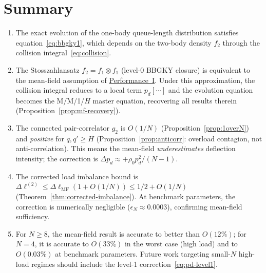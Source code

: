 \documentclass[11pt,a4paper]{article}
\newcommand{\pd}{p_d}
\newcommand{\fone}{f_1}
\newcommand{\ftwo}{f_2}
\newcommand{\gtwo}{g_2}
\begin{document}
\section{Summary}

\begin{enumerate}
  \item The exact evolution of the one-body queue-length distribution
        satisfies equation~\eqref{eq:bbgky1}, which depends on the
        two-body density $\ftwo$ through the collision integral~\eqref{eq:collision}.

  \item The Stosszahlansatz $\ftwo = \fone \otimes \fone$
        (level-0 BBGKY closure) is equivalent to the mean-field
        assumption of \hyperref[chap:load_balance]{Performance~I}.
        Under this approximation, the collision integral reduces to a
        local term $\pd[\cdots]$ and the evolution equation becomes
        the M/M/1/$H$ master equation, recovering all results therein
        (Proposition~\ref{prop:mf-recovery}).

  \item The connected pair-correlator $\gtwo$ is $O(1/N)$
        (Proposition~\ref{prop:1overN}) and \emph{positive} for
        $q, q' \geq H$ (Proposition~\ref{prop:anticorr}: overload
        contagion, not anti-correlation).
        This means the mean-field \emph{underestimates} deflection
        intensity; the correction is $\Delta\pd \approx +\rho_0\pd^2/(N-1)$.

  \item The corrected load imbalance bound is
        $\Delta\ell^{(2)} \leq \Delta\ell_{\mathrm{MF}}(1 + O(1/N)) \leq 1/2 + O(1/N)$
        (Theorem~\ref{thm:corrected-imbalance}).
        At benchmark parameters, the correction is numerically negligible
        ($\epsilon_N \approx 0.0003$), confirming mean-field sufficiency.

  \item For $N \geq 8$, the mean-field result is accurate to better than
        $O(12\%)$; for $N=4$, it is accurate to $O(33\%)$ in the worst case
        (high load) and to $O(0.03\%)$ at benchmark parameters.
        Future work targeting small-$N$ high-load regimes should include
        the level-1 correction~\eqref{eq:pd-level1}.
\end{enumerate}

\end{document}
